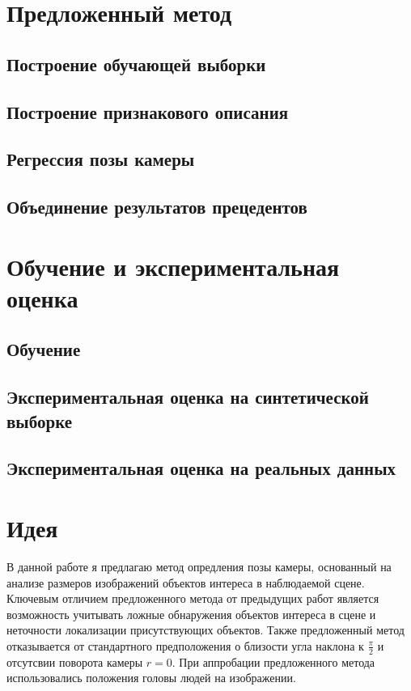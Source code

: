 \section{Предложенный метод}
\subsection{Построение обучающей выборки}
\subsection{Построение признакового описания}
\subsection{Регрессия позы камеры}
\subsection{Объединение результатов прецедентов}
\section{Обучение и экспериментальная оценка}
\subsection{Обучение}
\subsection{Экспериментальная оценка на синтетической выборке}
\subsection{Экспериментальная оценка на реальных данных}

\section{Идея}

В данной работе я предлагаю метод опредления позы камеры, основанный на анализе размеров изображений объектов интереса в наблюдаемой сцене. Ключевым отличием предложенного метода от предыдущих работ является возможность учитывать ложные обнаружения объектов интереса в сцене и неточности локализации присутствующих объектов. Также предложенный метод отказывается от стандартного предположения о близости угла наклона к 
$\frac{\pi}{2}$
и отсутсвии поворота камеры $r=0$. 
При аппробации предложенного метода использовались положения головы людей на изображении.

